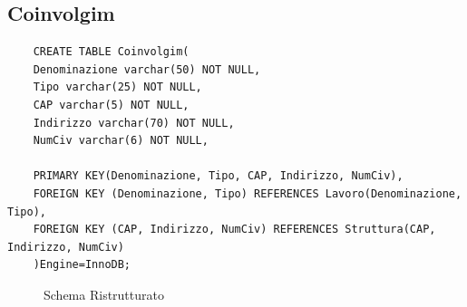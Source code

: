 \documentclass{elegantbook}
\begin{document}
\subsection{Coinvolgim}
\begin{verbatim}
	CREATE TABLE Coinvolgim(
	Denominazione varchar(50) NOT NULL,
	Tipo varchar(25) NOT NULL,
	CAP varchar(5) NOT NULL,
	Indirizzo varchar(70) NOT NULL, 
	NumCiv varchar(6) NOT NULL,
	
	PRIMARY KEY(Denominazione, Tipo, CAP, Indirizzo, NumCiv),
	FOREIGN KEY (Denominazione, Tipo) REFERENCES Lavoro(Denominazione, Tipo),
	FOREIGN KEY (CAP, Indirizzo, NumCiv) REFERENCES Struttura(CAP, Indirizzo, NumCiv)
	)Engine=InnoDB;
\end{verbatim}
\begin{figure}[H]
	\centering
	\caption{Schema Ristrutturato}
\end{figure}
\end{document}
